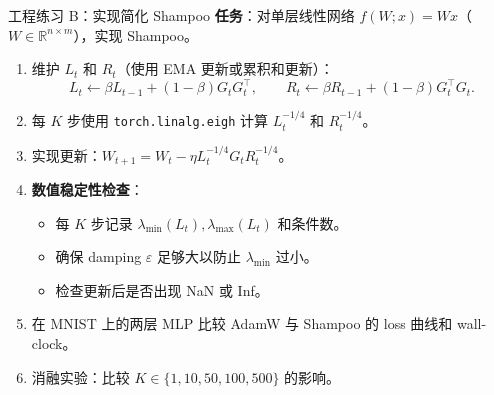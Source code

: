 \documentclass[aspectratio=169,10pt]{ctexbeamer}
\newcommand{\R}{\mathbb{R}}
\newcommand{\eps}{\varepsilon}
\begin{document}
\begin{frame}{工程练习 B：实现简化 Shampoo}
\textbf{任务}：对单层线性网络 $f(W;x)=Wx$（$W\in\R^{n\times m}$），实现 Shampoo。

\begin{enumerate}
  \item 维护 $L_t$ 和 $R_t$（使用 EMA 更新或累积和更新）：
  \[
    L_t\leftarrow\beta L_{t-1}+(1-\beta)G_t G_t^\top,\qquad
    R_t\leftarrow\beta R_{t-1}+(1-\beta)G_t^\top G_t.
  \]
  \item 每 $K$ 步使用 \texttt{torch.linalg.eigh} 计算 $L_t^{-1/4}$ 和 $R_t^{-1/4}$。
  \item 实现更新：$W_{t+1}=W_t-\eta L_t^{-1/4}G_t R_t^{-1/4}$。
  \item \textbf{数值稳定性检查}：
  \begin{itemize}
    \item 每 $K$ 步记录 $\lambda_{\min}(L_t),\lambda_{\max}(L_t)$ 和条件数。
    \item 确保 damping $\eps$ 足够大以防止 $\lambda_{\min}$ 过小。
    \item 检查更新后是否出现 NaN 或 Inf。
  \end{itemize}
  \item 在 MNIST 上的两层 MLP 比较 AdamW 与 Shampoo 的 loss 曲线和 wall-clock。
  \item 消融实验：比较 $K\in\{1,10,50,100,500\}$ 的影响。
\end{enumerate}
\end{frame}
\end{document}

